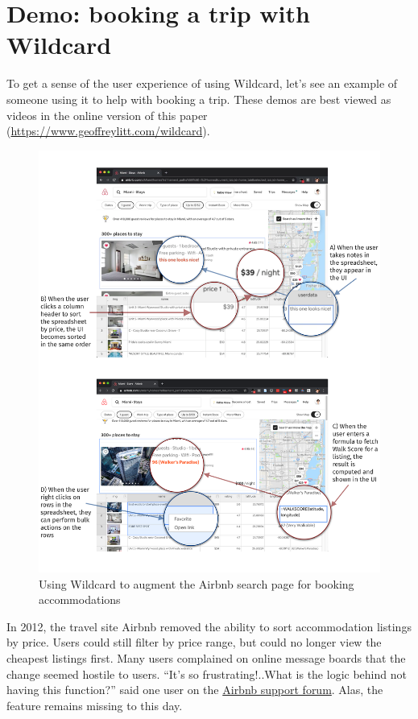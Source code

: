 \documentclass[english,submission]{programming}
\begin{document}
\hypertarget{demo-booking-a-trip-with-wildcard}{%
\section{Demo: booking a trip with
Wildcard}\label{demo-booking-a-trip-with-wildcard}}

To get a sense of the user experience of using Wildcard, let's see an
example of someone using it to help with booking a trip.{ These demos
are best viewed as videos in the online version of this paper
(\url{https://www.geoffreylitt.com/wildcard}).}

\begin{figure}
\hypertarget{fig:airbnb-demo}{%
\centering
\includegraphics{media/airbnb-demo-300dpi.png}
\caption{Using Wildcard to augment the Airbnb search page for booking
accommodations}\label{fig:airbnb-demo}
}
\end{figure}

In 2012, the travel site Airbnb removed the ability to sort
accommodation listings by price. Users could still filter by price
range, but could no longer view the cheapest listings first. Many users
complained on online message boards that the change seemed hostile to
users. ``It's so frustrating!..What is the logic behind not having this
function?'' said one user on the
\href{https://community.withairbnb.com/t5/Hosting/Sorting-listing-by-price/td-p/559404}{Airbnb
support forum}. Alas, the feature remains missing to this day.
\end{document}
